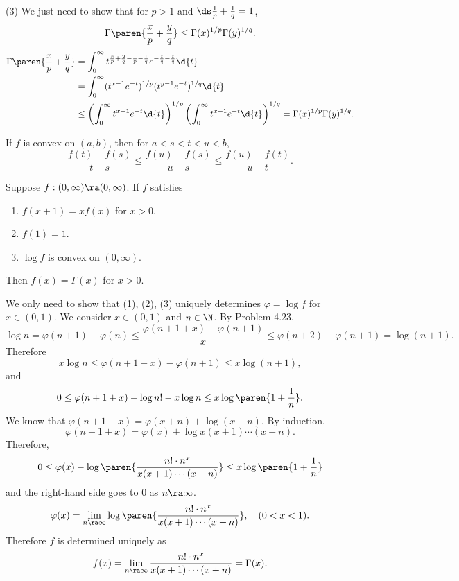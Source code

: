 (3) We just need to show that for \(p > 1\) and \(\ds\frac{1}{p} + \frac{1}{q} = 1\),
\[
    \Gamma\paren{\frac{x}{p} + \frac{y}{q}} \leq \Gamma(x)^{1/p} \Gamma(y)^{1/q}.
\]
\[
    \begin{aligned}
        \Gamma\paren{\frac{x}{p} + \frac{y}{q}} & = \int_0^\infty t^{\frac{x}{p} + \frac{y}{q} - \frac{1}{p} - \frac{1}{q}} e^{ -\frac{t}{q} -\frac{t}{q}} \d{t}                                    \\
                                                & = \int_0^\infty (t^{x-1}e^{-t})^{1/p} (t^{y-1}e^{-t})^{1/q} \d{t}                                                                                 \\
                                                & \leq \left(\int_0^\infty t^{x-1} e^{-t}\d{t}\right)^{1/p} \left(\int_0^\infty t^{x-1} e^{-t}\d{t}\right)^{1/q} = \Gamma(x)^{1/p} \Gamma(y)^{1/q}.
    \end{aligned}
\]

\medskip

\rmk {} If \(f\) is convex on \((a, b)\), then for \(a < s < t < u < b\),
\[
    \frac{f(t) - f(s)}{t-s} \leq \frac{f(u) - f(s)}{u - s} \leq \frac{f(u) - f(t)}{u-t}.
\]

 Suppose \(f : (0, \infty) \ra (0, \infty)\). If \(f\) satisfies
\begin{enumerate}
    \item \(f(x + 1) = xf(x)\) for \(x > 0\).
    \item \(f(1) = 1\).
    \item \(\log f\) is convex on \((0, \infty)\).
\end{enumerate}
Then \(f(x) = \Gamma(x)\) for \(x > 0\).

\pf We only need to show that (1), (2), (3) uniquely determines \(\varphi = \log f\) for \(x \in (0, 1)\). We consider \(x \in (0, 1)\) and \(n \in \N\). By {\sffamily Problem 4.23},
\[
    \log n = \varphi(n+1) - \varphi(n) \leq \frac{\varphi(n+1+x) - \varphi(n + 1)}{x} \leq \varphi(n+2) - \varphi(n+1) = \log(n+1).
\]
Therefore
\[
    x\log n \leq \varphi(n+1+x) - \varphi(n+1) \leq x \log(n+1),
\]
and
\[
    0 \leq \varphi(n+1+x) - \log n! - x\log n\leq x \log\paren{1 + \frac{1}{n}}.
\]
We know that \(\varphi(n+1+x) = \varphi(x + n) + \log(x + n)\). By induction,
\[
    \varphi(n+1 + x) = \varphi(x) + \log x(x+1)\cdots(x + n).
\]
Therefore,
\[
    0 \leq \varphi(x) - \log\paren{\frac{n!\cdot n^x}{x(x+1)\cdots(x+n)}} \leq x \log \paren{1 + \frac{1}{n}}
\]
and the right-hand side goes to \(0\) as \(n \ra \infty\).
\[
    \varphi(x) = \lim_{n\ra\infty} \log\paren{\frac{n!\cdot n^x}{x(x+1)\cdots(x+n)}}, \quad (0 < x < 1).
\]
Therefore \(f\) is determined uniquely as
\[
    f(x) = \lim_{n\ra\infty} \frac{n!\cdot n^x}{x(x+1)\cdots(x+n)} = \Gamma(x).
\]

